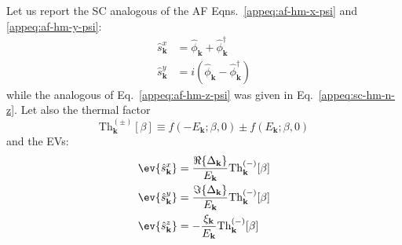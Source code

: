 {\color{tabred}
Let us report the SC analogous of the AF Eqns.~\eqref{appeq:af-hm-x-psi} and \eqref{appeq:af-hm-y-psi}:
\begin{align}
	\hat s_\mathbf{k}^x &= \hat \phi_\mathbf{k} + \hat \phi_\mathbf{k}^\dagger \label{appeq:sc-hm-x-psi} \\
	\hat s_\mathbf{k}^y &= i \left(
	\hat \phi_\mathbf{k} - \hat \phi_\mathbf{k}^\dagger 
	\right) \label{appeq:sc-hm-y-psi}
\end{align}
while the analogous of Eq.~\eqref{appeq:af-hm-z-psi} was given in Eq.~\eqref{appeq:sc-hm-n-z}. Let also the thermal factor
\begin{equation}\label{appeq:sc-thermal-factors-def}
	\mathrm{Th}_\mathbf{k}^{(\pm)}[\beta] \equiv 
	f\left(
		-E_\mathbf{k};\beta,0
	\right) \pm f\left(
		E_\mathbf{k};\beta,0
	\right)
\end{equation}
and the EVs:
\begin{align}
	\ev{\hat s_\mathbf{k}^x} &= \frac{\Re\lbrace\Delta_\mathbf{k}\rbrace}{E_\mathbf{k}} \mathrm{Th}_\mathbf{k}^{(-)}[\beta] \label{appeq:sc-hm-sx}\\
	\ev{\hat s_\mathbf{k}^y} &= \frac{\Im\lbrace\Delta_\mathbf{k}\rbrace}{E_\mathbf{k}}  \mathrm{Th}_\mathbf{k}^{(-)}[\beta] \label{appeq:sc-hm-sy}\\
	\ev{\hat s_\mathbf{k}^z} &=  -\frac{\xi_\mathbf{k}}{E_\mathbf{k}}  \mathrm{Th}_\mathbf{k}^{(-)}[\beta] \label{appeq:sc-hm-sz}
\end{align}

}
